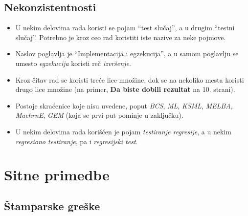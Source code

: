 \documentclass[a4paper]{report}
\begin{document}
\subsection{Nekonzistentnosti}
\begin{itemize}
\item U nekim delovima rada koristi se pojam ``test slučaj'', a u drugim ``testni slučaj''. Potrebno je kroz ceo rad koristiti iste nazive za neke pojmove.
\item Naslov poglavlja je ``Implementacija i egzekucija'', a u samom poglavlju se umesto {\em{egzekucija}} koristi reč {\em{izvršenje}}.
\item Kroz čitav rad se koristi treće lice množine, dok se na nekoliko mesta koristi drugo lice množine (na primer, {\bf{Da biste dobili rezultat}} na 10. strani).
\item Postoje skraćenice koje nisu uvedene, poput {\em{BCS}}, {\em{ML}}, {\em{KSML}}, {\em{MELBA}, {\em{MachrnE}}}, {\em{GEM}} (koja se prvi put pominje u zaključku).
\item U nekim delovima rada korišćen je pojam {\em{testiranje regresije}}, a u nekim {\em{regresiono testiranje}}, pa i {\em{regresijski test}}.
\end{itemize}


\section{Sitne primedbe}
\subsection{Štamparske greške}
\end{document}
